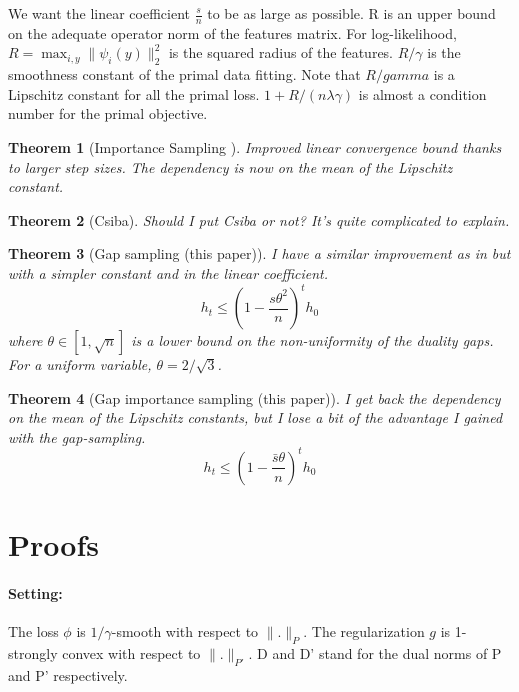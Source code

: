\documentclass{article}
\DeclareMathOperator{\1}{\mathbb{1}}
\newtheorem{theorem}{Theorem}
\begin{document}
We want the linear coefficient $\frac{s}{n}$ to be as large as possible. 
R is an upper bound on the adequate operator norm of the features matrix.
For log-likelihood, $R = \max_{i,y} \| \psi_i(y) \|_2^2 $ is the squared radius of the features. $R/\gamma$ is the smoothness constant of the primal data fitting.
Note that $R/gamma$ is a Lipschitz constant for all the primal loss. $1+R/(n \lambda \gamma)$ is almost a condition number for the primal objective.

\begin{theorem}[Importance Sampling \cite{richtarik}] 
	\label{importance}
	Improved linear convergence bound thanks to larger step sizes. The dependency is now on the mean of the Lipschitz constant.
\end{theorem}

\begin{theorem}[Csiba]
	\label{csiba}
	Should I put Csiba or not? It's quite complicated to explain.
\end{theorem}

\begin{theorem}[Gap sampling (this paper)]
	\label{gap}
	I have a similar improvement as in \cite{osokin2016minding} but with a simpler constant and in the linear coefficient. 
	\begin{equation}
		h_t \leq (1-\frac{s \theta^2}{n})^t  h_0
	\end{equation}
	where $\theta \in [1,\sqrt n] $ is a lower bound on the non-uniformity of the duality gaps.  For a uniform variable, $\theta = 2 / \sqrt 3 $.
\end{theorem}

\begin{theorem}[Gap importance sampling (this paper)]
	\label{gap+}
	I get back the dependency on the mean of the Lipschitz constants, but I lose a bit of the advantage I gained with the gap-sampling.
	\begin{equation}
		h_t \leq (1-\frac{\bar s \theta}{n})^t  h_0
	\end{equation}
\end{theorem}


\section{Proofs}

\paragraph{Setting:} The loss $\phi$ is $1/\gamma$-smooth with respect to $\|.\|_P$.
The regularization $g$ is 1-strongly convex with respect to $\|.\|_{P'}$.
D and D' stand for the dual norms of P and P' respectively. 
\end{document}
